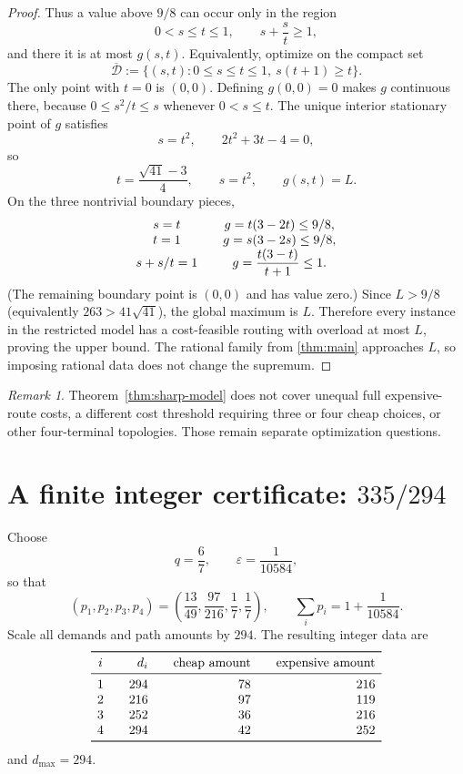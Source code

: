 \documentclass[11pt]{article}
\theoremstyle{remark}
\newtheorem{remark}[theorem]{Remark}
\begin{document}
\begin{proof}
Thus a value above $9/8$ can occur only in the region
\[
 0<s\le t\le1,
 \qquad
 s+\frac{s}{t}\ge1,
\]
and there it is at most $g(s,t)$.  Equivalently, optimize on the compact set
\[
 \overline{\mathcal D}:=
 \{(s,t):0\le s\le t\le1,\ s(t+1)\ge t\}.
\]
The only point with $t=0$ is $(0,0)$.  Defining $g(0,0)=0$ makes $g$
continuous there, because $0\le s^2/t\le s$ whenever $0<s\le t$.
The unique interior stationary point of $g$ satisfies
\[
 s=t^2,
 \qquad
 2t^2+3t-4=0,
\]
so
\[
 t=\frac{\sqrt{41}-3}{4},
 \qquad
 s=t^2,
 \qquad
 g(s,t)=L.
\]
On the three nontrivial boundary pieces,
\[
\begin{array}{c@{\qquad}c}
 s=t&g=t(3-2t)\le9/8,\\
 t=1&g=s(3-2s)\le9/8,\\
 s+s/t=1&g=\dfrac{t(3-t)}{t+1}\le1.
\end{array}
\]
(The remaining boundary point is $(0,0)$ and has value zero.)  Since
$L>9/8$ (equivalently $263>41\sqrt{41}$), the global maximum is $L$.
Therefore every instance in the restricted model has a
cost-feasible routing with overload at most $L$, proving the upper bound.
The rational family from \cref{thm:main} approaches $L$, so imposing rational
data does not change the supremum.
\end{proof}

\begin{remark}
Theorem~\ref{thm:sharp-model} does not cover unequal full expensive-route
costs, a different cost threshold requiring three or four cheap choices, or
other four-terminal topologies.  Those remain separate optimization
questions.
\end{remark}

\section{A finite integer certificate: \texorpdfstring{$335/294$}{335/294}}

Choose
\[
 q=\frac67,
 \qquad
 \varepsilon=\frac1{10584},
\]
so that
\[
 (p_1,p_2,p_3,p_4)=
 \left(\frac{13}{49},\frac{97}{216},\frac17,\frac17\right),
 \qquad
 \sum_i p_i=1+\frac1{10584}.
\]
Scale all demands and path amounts by $294$.  The resulting integer data are
\[
\begin{array}{c@{\qquad}r@{\qquad}r@{\qquad}r}
\toprule
 i&d_i&\text{cheap amount}&\text{expensive amount}\\
\midrule
1&294&78&216\\
2&216&97&119\\
3&252&36&216\\
4&294&42&252\\
\bottomrule
\end{array}
\]
and $d_{\max}=294$.
\end{document}
